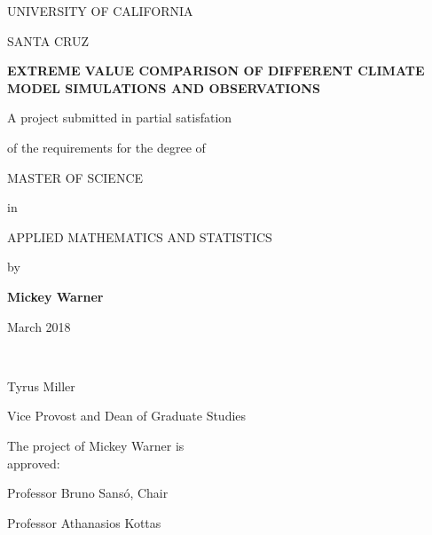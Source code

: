 \singlespacing

\begin{center}
UNIVERSITY OF CALIFORNIA
\bigskip

SANTA CRUZ
\bigskip
\bigskip
\bigskip

\textbf{EXTREME VALUE COMPARISON OF DIFFERENT CLIMATE MODEL SIMULATIONS AND OBSERVATIONS}
\bigskip
\bigskip
\bigskip

A project submitted in partial satisfation

of the requirements for the degree of
\bigskip
\bigskip

MASTER OF SCIENCE
\bigskip

in
\bigskip

APPLIED MATHEMATICS AND STATISTICS
\bigskip
\bigskip

by
\bigskip
\bigskip

\textbf{Mickey Warner}
\bigskip

March 2018
\bigskip
\bigskip

\end{center}


\begin{multicols*}{2}

\ 

\bigskip
\bigskip
\bigskip
\bigskip
\bigskip
\bigskip
\bigskip
\bigskip
\bigskip
\bigskip
\bigskip
\bigskip
\bigskip
\bigskip
\bigskip
\bigskip
\bigskip


\hline
\bigskip
\noindent Tyrus Miller

\noindent Vice Provost and Dean of Graduate Studies



\noindent The project of Mickey Warner is\\approved:
\bigskip
\bigskip
\bigskip
\bigskip

\hline
\bigskip
\noindent Professor Bruno Sans{\'o}, Chair
\bigskip
\bigskip
\bigskip
\bigskip

\hline
\bigskip
\noindent Professor Athanasios Kottas


\end{multicols*}




\doublespacing

\newpage
